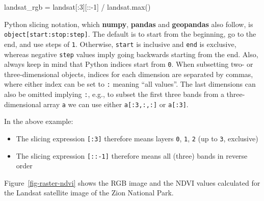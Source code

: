 \documentclass[
  letterpaper,
]{krantz}
\newenvironment{Shaded}{\begin{snugshade}}{\end{snugshade}}
\newcommand{\BuiltInTok}[1]{\textcolor[rgb]{0.00,0.23,0.31}{#1}}
\newcommand{\DecValTok}[1]{\textcolor[rgb]{0.68,0.00,0.00}{#1}}
\newcommand{\NormalTok}[1]{\textcolor[rgb]{0.00,0.23,0.31}{#1}}
\newcommand{\OperatorTok}[1]{\textcolor[rgb]{0.37,0.37,0.37}{#1}}
\providecommand{\tightlist}{%
  \setlength{\itemsep}{0pt}\setlength{\parskip}{0pt}}\usepackage{longtable,booktabs,array}
\begin{document}
\begin{Shaded}
\begin{Highlighting}[]
\NormalTok{landsat\_rgb }\OperatorTok{=}\NormalTok{ landsat[:}\DecValTok{3}\NormalTok{][::}\OperatorTok{{-}}\DecValTok{1}\NormalTok{] }\OperatorTok{/}\NormalTok{ landsat.}\BuiltInTok{max}\NormalTok{()}
\end{Highlighting}
\end{Shaded}

\begin{tcolorbox}[enhanced jigsaw, title=\textcolor{quarto-callout-note-color}{\faInfo}\hspace{0.5em}{Note}, arc=.35mm, toprule=.15mm, titlerule=0mm, colframe=quarto-callout-note-color-frame, breakable, toptitle=1mm, bottomtitle=1mm, rightrule=.15mm, colbacktitle=quarto-callout-note-color!10!white, leftrule=.75mm, left=2mm, bottomrule=.15mm, opacityback=0, coltitle=black, opacitybacktitle=0.6, colback=white]

Python slicing notation, which \textbf{numpy}, \textbf{pandas} and
\textbf{geopandas} also follow, is \texttt{object{[}start:stop:step{]}}.
The default is to start from the beginning, go to the end, and use steps
of \texttt{1}. Otherwise, \texttt{start} is inclusive and \texttt{end}
is exclusive, whereas negative \texttt{step} values imply going
backwards starting from the end. Also, always keep in mind that Python
indices start from \texttt{0}. When subsetting two- or three-dimensional
objects, indices for each dimension are separated by commas, where
either index can be set to \texttt{:} meaning ``all values''. The last
dimensions can also be omitted implying \texttt{:}, e.g., to subset the
first three bands from a three-dimensional array \texttt{a} we can use
either \texttt{a{[}:3,:,:{]}} or \texttt{a{[}:3{]}}.

In the above example:

\begin{itemize}
\tightlist
\item
  The slicing expression \texttt{{[}:3{]}} therefore means layers
  \texttt{0}, \texttt{1}, \texttt{2} (up to \texttt{3}, exclusive)
\item
  The slicing expression \texttt{{[}::-1{]}} therefore means all (three)
  bands in reverse order
\end{itemize}

\end{tcolorbox}

Figure~\ref{fig-raster-ndvi} shows the RGB image and the NDVI values
calculated for the Landsat satellite image of the Zion National Park.
\end{document}
